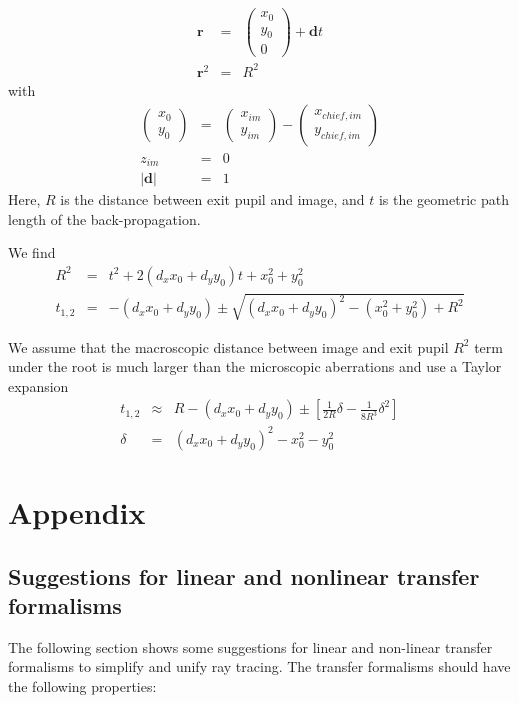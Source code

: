 \documentclass[12pt,a4paper,twoside,openright,BCOR10mm,headsepline,titlepage,abstracton,chapterprefix,final]{scrreprt}
\newcommand\Vector[1]{{\mathbf{#1}}}
\newcommand\Location{\Vector{r}}
\begin{document}
\begin{eqnarray}
 \Location &=& \begin{pmatrix} x_0 \\ y_0 \\ 0 \end{pmatrix} + \Vector{d} t \\
 \Location^2 &=& R^2
\end{eqnarray}
with
 \begin{eqnarray}
 \begin{pmatrix} x_0 \\ y_0 \end{pmatrix} &=& \begin{pmatrix} x_{im} \\ y_{im} \end{pmatrix} - \begin{pmatrix} x_{chief,im} \\ y_{chief,im} \end{pmatrix} \\
 z_{im} &=& 0 \\
 | \Vector{d} | &=& 1
\end{eqnarray}
Here, $R$ is the distance between exit pupil and image, and $t$ is the geometric path length of the back-propagation.

We find
\begin{eqnarray}
 R^2 &=&  t^2 + 2 (d_x x_0 + d_y y_0) t + x_0^2 + y_0^2 \\
 t_{1,2} &=& - (d_x x_0 + d_y y_0) \pm \sqrt{ (d_x x_0 + d_y y_0)^2 - (x_0^2 + y_0^2) + R^2 }
\end{eqnarray}

We assume that the macroscopic distance between image and exit pupil $R^2$ term under the root is much larger than the microscopic aberrations and use a Taylor expansion
\begin{eqnarray}
 t_{1,2} &\approx& R - (d_x x_0 + d_y y_0) \pm 
 \left[ 
   \frac{1}{2R} \delta - \frac{1}{8R^3} \delta^2
 \right]
 \\
 \delta &=& (d_x x_0 + d_y y_0)^2 - x_0^2 - y_0^2
\end{eqnarray}






\chapter{Appendix}
\section{Suggestions for linear and nonlinear transfer formalisms}
The following section shows some suggestions for linear and non-linear transfer formalisms
to simplify and unify ray tracing. The transfer formalisms should have the following properties:
\end{document}
